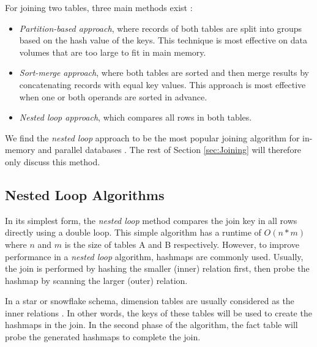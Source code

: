 For joining two tables, three main methods exist \cite{Bratbergsengen2015-ed}: 
\begin{itemize}
  \item \textit{Partition-based approach}, where records of both tables are split into groups based on the hash value of the keys. This technique is most effective on data volumes that are too large to fit in main memory.
  \item \textit{Sort-merge approach}, where both tables are sorted and then merge results by concatenating records with equal key values. This approach is most effective when one or both operands are sorted in advance.
  \item \textit{Nested loop approach}, which compares all rows in both tables.
\end{itemize}

We find the \textit{nested loop} approach to be the most popular joining algorithm for in-memory and parallel databases \cite{Boncz2002-yj}. The rest of Section \ref{sec:Joining} will therefore only discuss this method.

\subsection{Nested Loop Algorithms}
\label{sub:Nested Loop Algorithms}

In its simplest form, the \textit{nested loop} method compares the join key in all rows directly using a double loop. This simple algorithm has a runtime of $O(n*m)$ where $n$ and $m$ is the size of tables A and B respectively. However, to improve performance in a \textit{nested loop} algorithm, hashmaps are commonly used. Usually, the join is performed by hashing the smaller (inner) relation first, then probe the hashmap by scanning the larger (outer) relation. 

In a star or snowflake schema, dimension tables are usually considered as the inner relations \cite{Barber2012-xt, Raman2013-em}. In other words, the keys of these tables will be used to create the hashmaps in the join. In the second phase of the algorithm, the fact table will probe the generated hashmaps to complete the join. 


